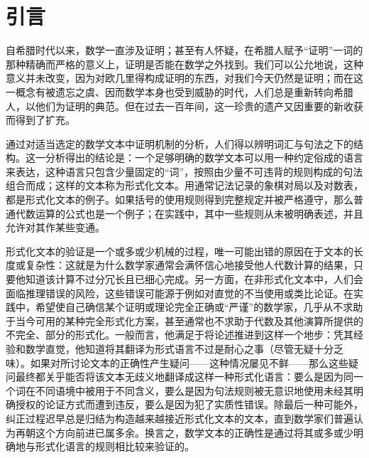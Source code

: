 \chapter*{引言}
{}

自希腊时代以来，数学一直涉及证明；甚至有人怀疑，在希腊人赋予“证明”一词的那种精确而严格的意义上，证明是否能在数学之外找到。我们可以公允地说，这种意义并未改变，因为对欧几里得构成证明的东西，对我们今天仍然是证明；而在这一概念有被遗忘之虞、因而数学本身也受到威胁的时代，人们总是重新转向希腊人，以他们为证明的典范。但在过去一百年间，这一珍贵的遗产又因重要的新收获而得到了扩充。

通过对适当选定的数学文本中证明机制的分析，人们得以辨明词汇与句法之下的结构。这一分析得出的结论是：一个足够明确的数学文本可以用一种约定俗成的语言来表达，这种语言只包含少量固定的“词”，按照由少量不可违背的规则构成的句法组合而成；这样的文本称为形式化文本。用通常记法记录的象棋对局以及对数表，都是形式化文本的例子。如果括号的使用规则得到完整规定并被严格遵守，那么普通代数运算的公式也是一个例子；在实践中，其中一些规则从未被明确表述，并且允许对其作某些变通。

形式化文本的验证是一个或多或少机械的过程，唯一可能出错的原因在于文本的长度或复杂性：这就是为什么数学家通常会满怀信心地接受他人代数计算的结果，只要他知道该计算不过分冗长且已细心完成。另一方面，在非形式化文本中，人们会面临推理错误的风险，这些错误可能源于例如对直觉的不当使用或类比论证。在实践中，希望使自己确信某个证明或理论完全正确或“严谨”的数学家，几乎从不求助于当今可用的某种完全形式化方案，甚至通常也不求助于代数及其他演算所提供的不完全、部分的形式化。一般而言，他满足于将论述推进到这样一个地步：凭其经验和数学直觉，他知道将其翻译为形式语言不过是耐心之事（尽管无疑十分乏味）。如果对所讨论文本的正确性产生疑问——这种情况屡见不鲜——那么这些疑问最终都关乎能否将该文本无歧义地翻译成这样一种形式化语言：要么是因为同一个词在不同语境中被用于不同含义，要么是因为句法规则被无意识地使用未经其明确授权的论证方式而遭到违反，要么是因为犯了实质性错误。除最后一种可能外，纠正过程迟早总是归结为构造越来越接近形式化文本的文本，直到数学家们普遍认为再朝这个方向前进已属多余。换言之，数学文本的正确性是通过将其或多或少明确地与形式化语言的规则相比较来验证的。

